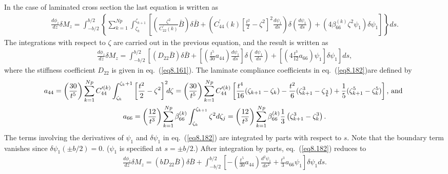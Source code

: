\documentclass{AeroStructure-ERJohnson}
\begin{document}
\noindent In the case of laminated cross section the last equation is
written as
\begin{gather*}
\frac{d \phi_{z}}{d z} \delta M_{z}=\int_{-b/ 2}^{b/
2}\left\{\sum_{k=1}^{N p}
\int_{\zeta_{k}}^{\zeta_{k+1}}\left[\left(\frac{\zeta^{2}}{C_{22}^{\prime}(k)}
\bar{B}\right) \delta
\bar{B}+\left(C^{\prime}_{44}(k)\left[\frac{t^{2}}{2}-\zeta^{2}\right]^{2}
\frac{d \psi_{1}}{d s}\right) \delta\left(\frac{d \psi_{1}}{d
s}\right)+\left(4 \beta_{66}^{(k)} \zeta^{2} \psi_{1}\right)
\delta \psi_{1}\right]\right\} d s.
\end{gather*}
The integrations with respect to $\zeta$ are carried out in the
previous equation, and the result is written as
\begin{align}\label{eq8.182}
\frac{d \phi_{z}}{d z} \delta M_{z}=\int_{-b/ 2}^{b/ 2}\left[\left(D_{22} \bar{B}\right) \delta
\bar{B}+\left[\left(\frac{t^{5}}{30} a_{44}\right) \frac{d
\psi_{1}}{d s}\right] \delta\left(\frac{d \psi_{1}}{d
s}\right)+\left[\left(4 \frac{t^{3}}{12} a_{66}\right)
\psi_{1}\right] \delta \psi_{1}\right] d s,
\end{align}
where the stiffness coefficient $D_{22}$ is given in
eq.~(\ref{eq8.161}). The laminate compliance coefficients in
eq.~(\ref{eq8.182})are defined by
\begin{gather}
a_{44}=\left(\frac{30}{t^{5}}\right)
\sum_{k=1}^{N p}C^{\prime(k)}_{44} \int_{\zeta_{k}}^{\zeta_{k}+1}
\left[\frac{t^{2}}{2}-\zeta^{2}\right]^{2}\hspace*{-4pt} d\zeta
=\left(\frac{30}{t^{5}}\right) \sum_{k=1}^{N p}
C^{\prime({k})}_{44}
\left[\frac{t^{4}}{16}(\zeta_{k+1}-\zeta_{k})
-\frac{t^{2}}{6}(\zeta_{k+1}^{3}-\zeta_{\frac{3}{k}})+\frac{1}{5}(\zeta_{k+1}^{5}-\zeta_{k}^{5})\right]\mbox{, and }\label{eq8.183}\\
a_{66}=\left(\frac{12}{t^{3}}\right) \sum_{k=1}^{N p} \beta_{66}^{(k)}
\int_{\zeta_{k}}^{\zeta_{k+1}} \zeta^{2} d\zeta_{j}
=\left(\frac{12}{t^{3}}\right) \sum_{k=1}^{N p} \beta_{66}^{(k)}
\frac{1}{3}\left(\zeta_{k+1}^{3}-\zeta_{k}^{3}\right).\label{eq8.184}
\end{gather}
The terms involving the derivatives of $\psi_{1}$ and $\delta
\psi_{1}$ in eq.~(\ref{eq8.182}) are integrated by parts with
respect to $s$. Note that the boundary term vanishes since $\delta
\psi_{1}(\pm b/ 2)=0$. ($\psi_{1}$ is specified at $s=\pm b/
2$.) After integration by parts, eq.~(\ref{eq8.182}) reduces to
\begin{align}\label{eq8.185}
\frac{d \phi_{z}}{d z} \delta M_{z}=\left(b D_{22} \bar{B}\right)
\delta \bar{B}+\int_{-b/ 2}^{b/ 2}\left[-\left(\frac{t^{5}}{30}
a_{44}\right) \frac{d^{2} \psi_{1}}{d s^{2}}+\frac{t^{3}}{3}
a_{66} \psi_{1}\right] \delta \psi_{1} d s.
\end{align}
\end{document}
